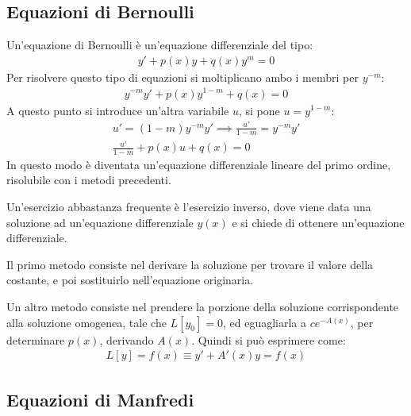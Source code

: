 \documentclass{article}
\numberwithin{equation}{subsection}
\begin{document}
\subsection{Equazioni di Bernoulli}

Un'equazione di Bernoulli è un'equazione differenziale del tipo:
\begin{gather}
    y'+p(x)y+q(x)y^m=0
\end{gather}
Per risolvere questo tipo di equazioni si moltiplicano ambo i membri per $y^{-m}$:
\begin{gather*}
    y^{-m}y'+p(x)y^{1-m}+q(x)=0
\end{gather*}
A questo punto si introduce un'altra variabile $u$, si pone $u=y^{1-m}$:
\begin{gather*}
    u'=(1-m)y^{-m}y'\implies \frac{u'}{1-m}=y^{-m}y'\\
    \displaystyle\frac{u'}{1-m}+p(x)u+q(x)=0
\end{gather*}
In questo modo è diventata un'equazione differenziale lineare del primo ordine, risolubile con i metodi precedenti. 


Un'esercizio abbastanza frequente è l'esercizio inverso, dove viene data una soluzione ad un'equazione differenziale $y(x)$ e si chiede di ottenere un'equazione differenziale. 

Il primo metodo consiste nel derivare la soluzione per trovare il valore della costante, e poi sostituirlo nell'equazione originaria. 

Un altro metodo consiste nel prendere la porzione della soluzione corrispondente alla soluzione omogenea, tale che $L[y_0]=0$, ed eguagliarla a $ce^{-A(x)}$, per determinare $p(x)$, derivando $A(x)$. 
Quindi si può esprimere come:
\begin{gather*}
    L[y]=f(x)\equiv y'+A'(x)y=f(x)
\end{gather*}

\subsection{Equazioni di Manfredi}
\end{document}

